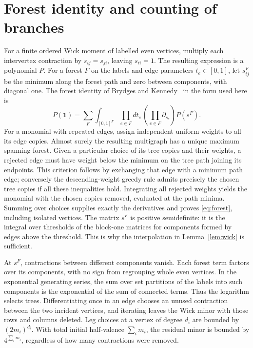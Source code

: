\documentclass[11pt]{article}
\begin{document}
\section{Forest identity and counting of branches}\label{app:trees}
For a finite ordered Wick moment of labelled even vertices, multiply each intervertex contraction by $s_{ij}=s_{ji}$, leaving $s_{ii}=1$. The resulting expression is a polynomial $P$. For a forest $F$ on the labels and edge parameters $t_e\in[0,1]$, let $s^F_{ij}$ be the minimum along the forest path and zero between components, with diagonal one. The forest identity of Brydges and Kennedy~\cite{bk} in the form used here is
\begin{equation}\label{eq:forest}
 P(\mathbf 1)=\sum_F\int_{[0,1]^F}\prod_{e\in F}dt_e\,
       \left(\prod_{e\in F}\partial_{s_e}\right)P(s^F).
\end{equation}
For a monomial with repeated edges, assign independent uniform weights to all its edge copies. Almost surely the resulting multigraph has a unique maximum spanning forest. Given a particular choice of its tree copies and their weights, a rejected edge must have weight below the minimum on the tree path joining its endpoints. This criterion follows by exchanging that edge with a minimum path edge; conversely the descending-weight greedy rule admits precisely the chosen tree copies if all these inequalities hold. Integrating all rejected weights yields the monomial with the chosen copies removed, evaluated at the path minima. Summing over choices supplies exactly the derivatives and proves \eqref{eq:forest}, including isolated vertices. The matrix $s^F$ is positive semidefinite: it is the integral over thresholds of the block-one matrices for components formed by edges above the threshold. This is why the interpolation in Lemma~\ref{lem:wick} is sufficient.

At $s^F$, contractions between different components vanish. Each forest term factors over its components, with no sign from regrouping whole even vertices. In the exponential generating series, the sum over set partitions of the labels into such components is the exponential of the sum of connected terms. Thus the logarithm selects trees. Differentiating once in an edge chooses an unused contraction between the two incident vertices, and iterating leaves the Wick minor with those rows and columns deleted. Leg choices at a vertex of degree $d_i$ are bounded by $(2m_i)^{d_i}$. With total initial half-valence $\sum_i m_i$, the residual minor is bounded by $4^{\sum_i m_i}$, regardless of how many contractions were removed.
\end{document}
